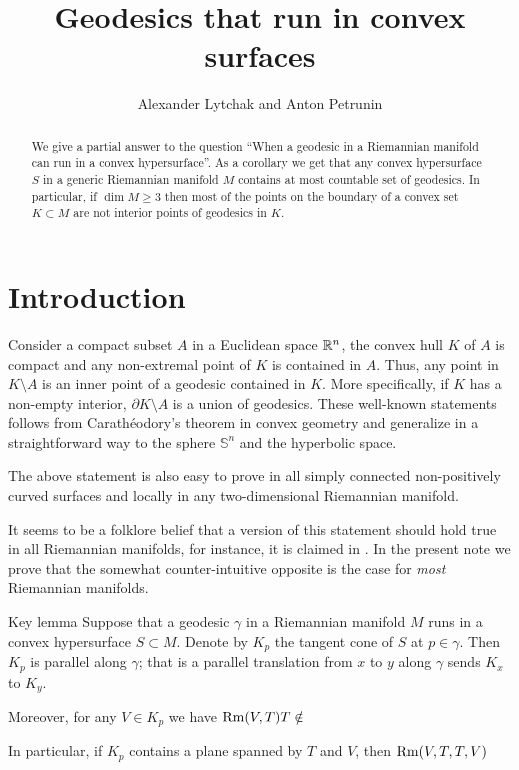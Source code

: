 \documentclass[a4paper,10pt]{article}
\begin{document}
 
\title{Geodesics that run in convex surfaces}
\author{Alexander Lytchak and Anton Petrunin}
\date{}
\maketitle

\begin{abstract}
We give a partial answer to the question ``When a geodesic in a Riemannian manifold can run in a convex hypersurface''.
As a corollary we get that any convex hypersurface $S$ in a generic Riemannian manifold $M$ contains at most countable set of geodesics.
In particular, if $\dim M\ge 3$ then most of the points on the boundary of a convex set $K\subset M$ are not interior points of geodesics in $K$.
\end{abstract}

\section{Introduction}
 Consider  a compact subset  $A$ in a Euclidean space $\mathbb{R}^n$, the convex hull $K$ of $A$
 is compact and any non-extremal point of $K$ is contained in $A$. Thus,  any point in $K\setminus A$ is an inner point of a geodesic contained in $K$. More specifically,
 if $K$ has a non-empty interior,  $\partial K \setminus A$ is  a union of geodesics.  
 These well-known statements follows from Carathéodory's theorem in convex geometry and generalize in a straightforward way to the sphere $\mathbb S^n$ and the hyperbolic space.
 
 
 The above statement is also easy to prove in all simply connected non-positively curved surfaces and locally in any two-dimensional Riemannian manifold.
 

It seems to be a folklore belief that a version of this statement should hold true in all Riemannian manifolds, for instance, it is claimed in \cite[Lemma 9.1]{Ghomi}.   In the present note we prove that the somewhat counter-intuitive opposite is the case for  \emph{most} Riemannian manifolds.

\begin{thm}{Key lemma}
Suppose that a geodesic $\gamma$ in a  Riemannian manifold $M$ runs in a convex hypersurface $S\subset M$.
Denote by $K_p$ the tangent cone of $S$ at $p\in\gamma$.
Then $K_p$ is parallel along $\gamma$; that is a parallel translation from $x$ to $y$ along $\gamma$ sends $K_x$ to $K_y$.

Moreover, for any $V\in K_p$ we have $\operatorname{Rm}(V,T)T\notin $

In particular, if $K_p$ contains a plane spanned by $T$ and $V$, then 
$\operatorname{Rm}(V,T,T,V)$


\end{thm}
\end{document}
